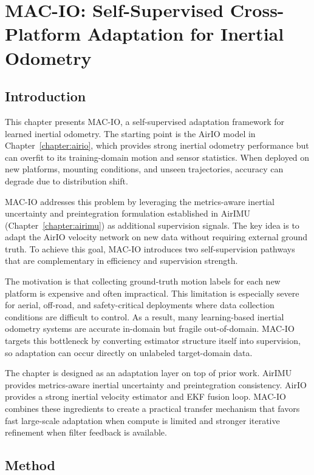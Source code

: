 \chapter{MAC-IO: Self-Supervised Cross-Platform Adaptation for Inertial Odometry} \label{chapter:macio}

\section{Introduction}

This chapter presents MAC-IO, a self-supervised adaptation framework for learned inertial odometry.
The starting point is the AirIO model in Chapter~\ref{chapter:airio}, which provides strong inertial odometry performance but can overfit to its training-domain motion and sensor statistics.
When deployed on new platforms, mounting conditions, and unseen trajectories, accuracy can degrade due to distribution shift.

MAC-IO addresses this problem by leveraging the metrics-aware inertial uncertainty and preintegration formulation established in AirIMU (Chapter~\ref{chapter:airimu}) as additional supervision signals.
The key idea is to adapt the AirIO velocity network on new data without requiring external ground truth.
To achieve this goal, MAC-IO introduces two self-supervision pathways that are complementary in efficiency and supervision strength.

The motivation is that collecting ground-truth motion labels for each new platform is expensive and often impractical.
This limitation is especially severe for aerial, off-road, and safety-critical deployments where data collection conditions are difficult to control.
As a result, many learning-based inertial odometry systems are accurate in-domain but fragile out-of-domain.
MAC-IO targets this bottleneck by converting estimator structure itself into supervision, so adaptation can occur directly on unlabeled target-domain data.

The chapter is designed as an adaptation layer on top of prior work.
AirIMU provides metrics-aware inertial uncertainty and preintegration consistency.
AirIO provides a strong inertial velocity estimator and EKF fusion loop.
MAC-IO combines these ingredients to create a practical transfer mechanism that favors fast large-scale adaptation when compute is limited and stronger iterative refinement when filter feedback is available.

\section{Method}
\label{sec:macio:method}

